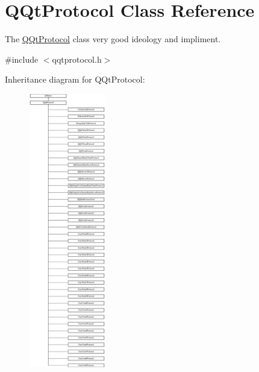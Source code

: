 \hypertarget{class_q_qt_protocol}{}\section{Q\+Qt\+Protocol Class Reference}
\label{class_q_qt_protocol}


The \mbox{\hyperlink{class_q_qt_protocol}{Q\+Qt\+Protocol}} class very good ideology and impliment.  




{\ttfamily \#include $<$qqtprotocol.\+h$>$}

Inheritance diagram for Q\+Qt\+Protocol\+:\begin{figure}[H]
\begin{center}
\leavevmode
\includegraphics[height=12.000000cm]{class_q_qt_protocol}
\end{center}
\end{figure}
